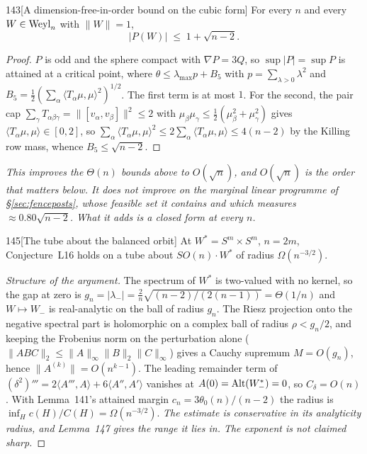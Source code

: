 \begin{Lem}{143}[A dimension-free-in-order bound on the cubic form]
For every $n$ and every $W\in\mathrm{Weyl}_n$ with $\|W\|=1$,
\[
\lvert P(W)\rvert\;\le\;1+\sqrt{n-2}.
\]
\end{Lem}

\begin{proof}
$P$ is odd and the sphere compact with $\nabla P=3Q$, so $\sup\lvert P\rvert=\sup P$ is attained at a critical point, where $\theta\le\lambda_{\max}p+B_5$ with $p=\sum_{\lambda>0}\lambda^2$ and $B_5=\tfrac12(\sum_\alpha\langle T_\alpha\mu,\mu\rangle^2)^{1/2}$. The first term is at most $1$. For the second, the pair cap $\sum_\gamma T_{\alpha\beta\gamma}=\|[v_\alpha,v_\beta]\|^2\le2$ with $\mu_\beta\mu_\gamma\le\tfrac12(\mu_\beta^2+\mu_\gamma^2)$ gives $\langle T_\alpha\mu,\mu\rangle\in[0,2]$, so $\sum_\alpha\langle T_\alpha\mu,\mu\rangle^2\le2\sum_\alpha\langle T_\alpha\mu,\mu\rangle\le4(n-2)$ by the Killing row mass, whence $B_5\le\sqrt{n-2}$.
\end{proof}

\emph{This improves the $\Theta(n)$ bounds above to $O(\sqrt n)$, and $O(\sqrt n)$ is the order that matters below. It does not improve on the marginal linear programme of \S\ref{sec:fenceposts}, whose feasible set it contains and which measures $\approx0.80\sqrt{n-2}$. What it adds is a closed form at every $n$.}

\begin{Lem}{145}[The tube about the balanced orbit]
At $W^*=S^{m}\times S^{m}$, $n=2m$, Conjecture~L16 holds on a tube about $SO(n)\cdot W^*$ of radius $\Omega(n^{-3/2})$.
\end{Lem}

\begin{proof}[Structure of the argument]
The spectrum of $W^*$ is two-valued with no kernel, so the gap at zero is $g_n=\lvert\lambda_-\rvert=\tfrac2n\sqrt{(n-2)/(2(n-1))}=\Theta(1/n)$ and $W\mapsto W_-$ is real-analytic on the ball of radius $g_n$. The Riesz projection onto the negative spectral part is holomorphic on a complex ball of radius $\rho<g_n/2$, and keeping the Frobenius norm on the perturbation alone ($\|ABC\|_2\le\|A\|_\infty\|B\|_2\|C\|_\infty$) gives a Cauchy supremum $M=O(g_n)$, hence $\|A^{(k)}\|=O(n^{k-1})$. The leading remainder term of $(\delta^2)'''=2\langle A''',A\rangle+6\langle A'',A'\rangle$ vanishes at $A(0)=\mathrm{Alt}(W^*_-)=0$, so $C_\delta=O(n)$. With Lemma~141's attained margin $c_n=3\theta_0(n)/(n-2)$ the radius is $\inf_H c(H)/C(H)=\Omega(n^{-3/2})$. \emph{The estimate is conservative in its analyticity radius, and Lemma~147 gives the range it lies in. The exponent is not claimed sharp.}
\end{proof}

